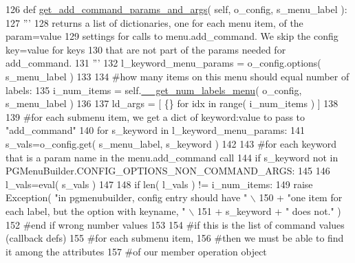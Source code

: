 \begin{DoxyCode}
126     \textcolor{keyword}{def }\hyperlink{classnegui_1_1pgmenubuilder_1_1PGMenuBuilder_a564a7629d3ba8ac1666a6f8a046d82f2}{get\_add\_command\_params\_and\_args}( self,  o\_config, s\_menu\_label ):
127         \textcolor{stringliteral}{'''}
128 \textcolor{stringliteral}{        returns a list of dictionaries, one for each menu item, of the param=value}
129 \textcolor{stringliteral}{        settings for calls to menu.add\_command.  We skip the config key=value for keys}
130 \textcolor{stringliteral}{        that are not part of the params needed for add\_command. }
131 \textcolor{stringliteral}{        '''}
132         l\_keyword\_menu\_params = o\_config.options( s\_menu\_label )    
133 
134         \textcolor{comment}{#how many items on this menu should equal number of labels:}
135         i\_num\_items = self.\hyperlink{classnegui_1_1pgmenubuilder_1_1PGMenuBuilder_a70776ac09761aeef9ee6df67c1dd9140}{\_\_get\_num\_labels\_menu}( o\_config, s\_menu\_label )
136 
137         ld\_args = [ \{\} \textcolor{keywordflow}{for} idx \textcolor{keywordflow}{in} range( i\_num\_items ) ]
138 
139         \textcolor{comment}{#for each submenu item, we get a dict of keyword:value to pass to "add\_command"}
140         \textcolor{keywordflow}{for} s\_keyword \textcolor{keywordflow}{in} l\_keyword\_menu\_params:
141             s\_vals=o\_config.get( s\_menu\_label, s\_keyword )
142 
143             \textcolor{comment}{#for each keyword that is a param name in the menu.add\_command call}
144             \textcolor{keywordflow}{if} s\_keyword \textcolor{keywordflow}{not} \textcolor{keywordflow}{in} PGMenuBuilder.CONFIG\_OPTIONS\_NON\_COMMAND\_ARGS:
145 
146                 l\_vals=eval( s\_vals )
147 
148                 \textcolor{keywordflow}{if} len( l\_vals ) != i\_num\_items:
149                     \textcolor{keywordflow}{raise} Exception( \textcolor{stringliteral}{"in pgmenubuilder, config entry should have "} \(\backslash\)
150                             + \textcolor{stringliteral}{"one item for each label, but the option with keyname, "} \(\backslash\)
151                             + s\_keyword + \textcolor{stringliteral}{" does not."} )
152                 \textcolor{comment}{#end if wrong number values}
153                 
154                 \textcolor{comment}{#if this is the list of command values (callback defs) }
155                 \textcolor{comment}{#for each submenu item,}
156                 \textcolor{comment}{#then we must be able to find it among the attributes}
157                 \textcolor{comment}{#of our member operation object}

\end{DoxyCode}
